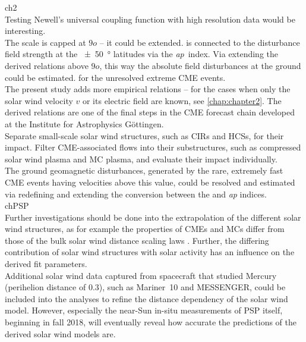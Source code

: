 ch2\\
Testing Newell's universal coupling function with high resolution data would be interesting.\\

The \Kp{} scale is capped at $9o$ -- it could be extended. \Kp{} is connected to the disturbance field strength at the \SI{+-50}{\degree} latitudes via the \textit{ap}~index. Via extending the derived \Kp{} relations above $9o$, this way the absolute field disturbances at the ground could be estimated. for the unresolved extreme CME events.\\

The present study adds more empirical \Kp{} relations -- for the cases when only the solar wind velocity $v$ or its electric field \vBz{} are known, see \autoref{chap:chapter2}. The derived \Kp{} relations are one of the final steps in the CME forecast chain developed at the Institute for Astrophysics Göttingen.\\

Separate small-scale solar wind structures, such as CIRs and HCSs, for their \Kp{} impact. Filter CME-associated flows into their substructures, such as compressed solar wind plasma and MC plasma, and evaluate their \Kp{} impact individually.\\

The ground geomagnetic disturbances, generated by the rare, extremely fast CME events having velocities above this value, could be resolved and estimated via redefining and extending the conversion between the \Kp{} and \textit{ap} indices.\\

chPSP\\
Further investigations should be done into the extrapolation of the different solar wind structures, as for example the properties of CMEs and MCs differ from those of the bulk solar wind distance scaling laws \citep{Bothmer1998}. Further, the differing contribution of solar wind structures with solar activity has an influence on the derived fit parameters.\\

Additional solar wind data captured from spacecraft that studied Mercury (perihelion distance of \SI{0.3}{\au}), such as Mariner~10 and MESSENGER, could be included into the analyses to refine the distance dependency of the solar wind model.
However, especially the near-Sun in-situ measurements of PSP itself, beginning in fall 2018, will eventually reveal how accurate the predictions of the derived solar wind models are.\\

